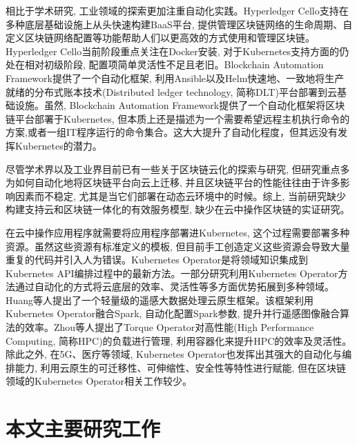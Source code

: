 相比于学术研究, 工业领域的探索更加注重自动化实践。Hyperledger Cello\footnotemark[1]支持在多种底层基础设施上从头快速构建BaaS平台, 提供管理区块链网络的生命周期、自定义区块链网络配置等功能帮助人们以更高效的方式使用和管理区块链。Hyperledger Cello当前阶段重点关注在Docker安装, 对于Kubernetes支持方面的仍处在相对初级阶段, 配置项简单灵活性不足且老旧。Blockchain Automation Framework\footnotemark[2]提供了一个自动化框架, 利用Ansible\footnotemark[3]以及Helm\footnotemark[4]快速地、一致地将生产就绪的分布式账本技术(Distributed ledger technology, 简称DLT)平台部署到云基础设施。虽然, Blockchain Automation Framework提供了一个自动化框架将区块链平台部署于Kubernetes, 但本质上还是描述为一个需要希望远程主机执行命令的方案,或者一组IT程序运行的命令集合。这大大提升了自动化程度，但其远没有发挥Kubernetes的潜力。

尽管学术界以及工业界目前已有一些关于区块链云化的探索与研究, 但研究重点多为如何自动化地将区块链平台向云上迁移, 并且区块链平台的性能往往由于许多影响因素而不稳定, 尤其是当它们部署在动态云环境中的时候。综上, 当前研究缺少构建支持云和区块链一体化的有效服务模型\cite{9582270}, 缺少在云中操作区块链的实证研究\cite{8790849}。

在云中操作应用程序就需要将应用程序部署进Kubernetes, 这个过程需要部署多种资源。虽然这些资源有标准定义的模板, 但目前手工创造定义这些资源会导致大量重复的代码并引入人为错误。Kubernetes Operator是将领域知识集成到Kubernetes API编排过程中的最新方法\cite{henning2021reproducible}。一部分研究利用Kubernetes Operator方法通过自动化的方式将云底层的效率、灵活性等多方面优势拓展到多种领域。Huang等人\cite{huang2021fly}提出了一个轻量级的遥感大数据处理云原生框架。该框架利用Kubernetes Operator融合Spark, 自动化配置Spark参数, 提升并行遥感图像融合算法的效率。Zhou等人\cite{zhou2021container}提出了Torque Operator对高性能(High Performance Computing, 简称HPC)的负载进行管理, 利用容器化来提升HPC的效率及灵活性。除此之外, 在5G\cite{arouk20205g}\cite{wiranata2020automation}、医疗\cite{rouzbeh2020unified}等领域, Kubernetes Operator也发挥出其强大的自动化与编排能力, 利用云原生的可迁移性、可伸缩性、安全性等特性进行赋能, 但在区块链领域的Kubernetes Operator相关工作较少。


\section{本文主要研究工作}

